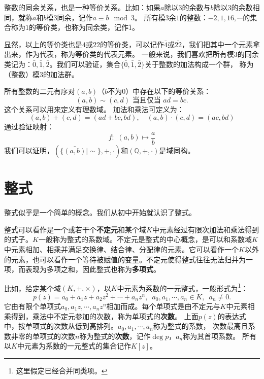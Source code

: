 \documentclass[12pt,UTF8,fontset=none]{ctexbook}
\begin{document}
\begin{appendix}
整数的同余关系，也是一种等价关系。比如：如果$a$除以$3$的余数与$b$除以$3$的余数相同，就称$a$和$b$模$3$同余，记作$a \equiv b \mod{3}$。
所有模$3$余$1$的整数：$-2, 1, 16, \cdots$的集合称为$1$的等价类，也称为同余类，记作$\bar{1}$。

显然，以上的等价类也是$4$或$22$的等价类，可以记作$\bar{4}$或$\bar{22}$，我们把其中一个元素拿出来，作为代表，称为等价类的代表元素。
一般来说，我们喜欢把所有模$3$的同余类记为：$\bar{0}, \bar{1}, \bar{2}$。我们可以验证，集合$\{\bar{0}, \bar{1}, \bar{2}\}$关于整数的加法构成一个群，
称为（整数）模$3$的加法群。

所有整数的二元有序对$(a, b)$（$b$不为$0$）中存在以下的等价关系：
$$(a, b) \sim (c, d) \mbox{ 当且仅当 } ad = bc.$$
这个关系可以用来定义有理数域。
加法和乘法可定义为：
$$ (a, b) + (c, d) = (ad + bc, bd), \quad (a, b) \cdot (c, d) = (ac, bd)$$
通过验证映射：
$$ f: \,\, (a, b) \mapsto \frac{a}{b}$$
我们可以证明，$\left(\{\bar{(a, b)} | \sim\}, +, \cdot\right)$和$\left(\mathbb{Q}, +, \cdot\right)$是域同构。



\section{整式}
整式似乎是一个简单的概念。我们从初中开始就认识了整式。

整式可以看作是一个或若干个\textbf{不定元}和某个域$K$中元素经过有限次加法和乘法得到的式子。$K$一般称为整式的系数域。不定元是整式的中心概念，是可以和系数域$K$中元素相加、相乘并满足交换律、结合律、分配律的元素。它可以看作一个$K$以外的元素，也可以看作一个等待被赋值的变量。不定元使得整式往往无法归并为一项，而表现为多项之和，因此整式也称为\textbf{多项式}。

比如，给定某个域$(K, +, \times )$，以$K$中元素为系数的一元整式，一般形式为\footnote{这里假定已经合并同类项。}：
$$ p(z) = a_0 + a_1 z + a_2 z^2 + \cdots + a_n z^n, \,\,\, a_0, a_1, \cdots ,a_n \in K, \,\,\, a_n \neq 0.$$
它由有限个单项式$a_0, a_1 z, \cdots, a_n z^n$相加而成。每个单项式是由不定元与$K$中元素相乘得到，乘法中不定元参加的次数，称为单项式的\textbf{次数}。
上面$p(z)$的表达式中，按单项式的次数从低到高排列。$a_0, a_1, \cdots , a_n$称为整式的系数，
次数最高且系数非零的单项式的次数$n$称为整式的\textbf{次数}，记作$\deg{p}$，$a_n$称为其首项系数。
所有以$K$中元素为系数的一元整式的集合记作$K[z]$。


\end{appendix}
\end{document}
